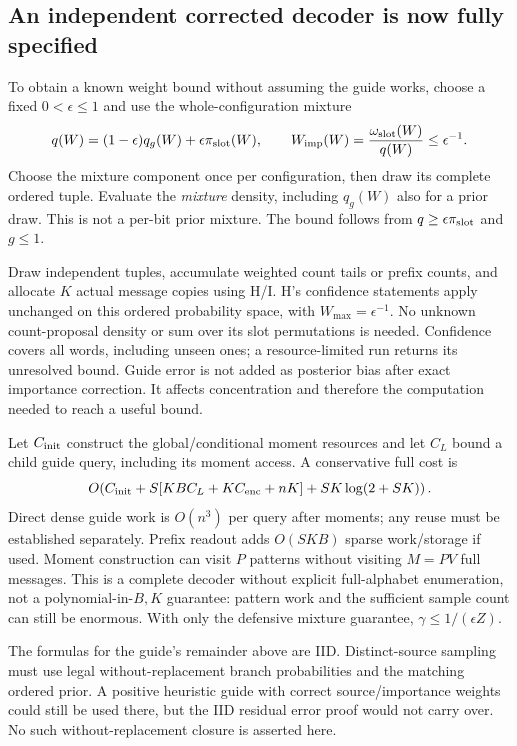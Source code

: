 \documentclass[10pt,a4paper]{article}
\begin{document}
\subsection{An independent corrected decoder is now fully specified}
To obtain a known weight bound without assuming the guide works, choose a fixed $0<\epsilon\leq1$ and use
the whole-configuration mixture
\begin{equation}
 q(W)=(1-\epsilon)q_g(W)+\epsilon\pi_{\rm slot}(W),\qquad
 W_{\rm imp}(W)=\frac{\omega_{\rm slot}(W)}{q(W)}\leq\epsilon^{-1}.
 \label{eq:guided-mixture}
\end{equation}
Choose the mixture component once per configuration, then draw its complete ordered tuple. Evaluate the
\emph{mixture} density, including $q_g(W)$ also for a prior draw. This is not a per-bit prior mixture.
The bound follows from $q\geq\epsilon\pi_{\rm slot}$ and $g\leq1$.

Draw independent tuples, accumulate weighted count tails or prefix counts, and allocate $K$ actual message
copies using H/I. H's confidence statements apply unchanged on this ordered probability space, with
$W_{\max}=\epsilon^{-1}$. No unknown count-proposal density or sum over its slot permutations is needed.
Confidence covers all words, including unseen ones; a resource-limited run returns its unresolved bound.
Guide error is not added as posterior bias after exact importance correction. It affects concentration
and therefore the computation needed to reach a useful bound.

Let $C_{\rm init}$ construct the global/conditional moment resources and let $C_L$ bound a child guide query,
including its moment access. A conservative full cost is
\begin{equation}
 O\!\left(C_{\rm init}+S[KB C_L+K C_{\rm enc}+nK]
                         +SK\log(2+SK)\right).
 \label{eq:guided-decoder-cost}
\end{equation}
Direct dense guide work is $O(n^3)$ per query after moments; any reuse must be established separately.
Prefix readout adds $O(SKB)$ sparse work/storage if used. Moment construction can visit $P$ patterns
without visiting $M=PV$ full messages. This is a complete decoder without explicit full-alphabet
enumeration, not a polynomial-in-$B,K$ guarantee: pattern work and the sufficient sample count can still
be enormous. With only the defensive mixture guarantee, $\gamma\leq1/(\epsilon Z)$.

The formulas for the guide's remainder above are IID. Distinct-source sampling must use legal
without-replacement branch probabilities and the matching ordered prior. A positive heuristic guide with
correct source/importance weights could still be used there, but the IID residual error proof would not
carry over. No such without-replacement closure is asserted here.
\end{document}
